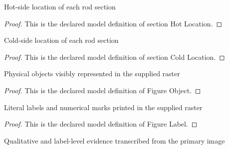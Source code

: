 \begin{definition}
  \label{def:physics:phyx-mini-0488:phyxminiproblems-problemphyxmini0488-sectionhotlocation}
  Hot-side location of each rod section
\end{definition}
\begin{proof}
  This is the declared model definition of section Hot Location.
\end{proof}
\begin{definition}
  \label{def:physics:phyx-mini-0488:phyxminiproblems-problemphyxmini0488-sectioncoldlocation}
  Cold-side location of each rod section
\end{definition}
\begin{proof}
  This is the declared model definition of section Cold Location.
\end{proof}
\begin{definition}
  \label{def:physics:phyx-mini-0488:phyxminiproblems-problemphyxmini0488-figureobject}
  Physical objects visibly represented in the supplied raster
\end{definition}
\begin{proof}
  This is the declared model definition of Figure Object.
\end{proof}
\begin{definition}
  \label{def:physics:phyx-mini-0488:phyxminiproblems-problemphyxmini0488-figurelabel}
  Literal labels and numerical marks printed in the supplied raster
\end{definition}
\begin{proof}
  This is the declared model definition of Figure Label.
\end{proof}
\begin{definition}
  \label{def:physics:phyx-mini-0488:phyxminiproblems-problemphyxmini0488-compositerodfigure}
  Qualitative and label-level evidence transcribed from the primary image
\end{definition}
